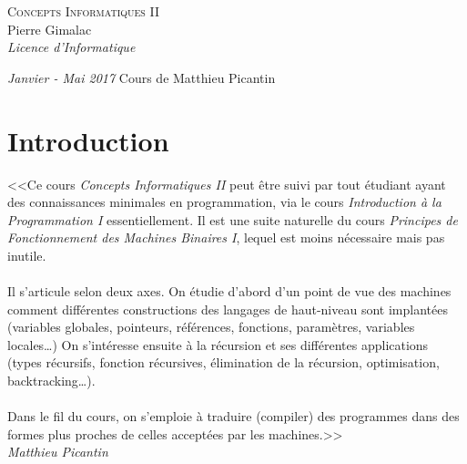 \documentclass[a4paper,10pt]{book} %
\begin{document}
\begin{titlepage}
\thispagestyle{empty}
\begin{center}
\vspace*{7cm}
\Huge \textsc{Concepts Informatiques II}\\
\vspace{1.5cm}
\Large Pierre Gimalac\\
\vspace{0.5cm}
\large \textit{Licence d'Informatique}
\vfill
\end{center}
\large \textit{Janvier - Mai 2017}
\hfill 
\large Cours de Matthieu Picantin
\restoregeometry
\end{titlepage}

\lstset{language=Java}

\renewcommand{\contentsname}{Sommaire}
\thispagestyle{empty}
\tableofcontents
\thispagestyle{empty}

\chapter*{Introduction}
<<Ce cours \textit{Concepts Informatiques II} peut être suivi par tout étudiant ayant des connaissances minimales en programmation, via le cours \textit{Introduction à la Programmation I} essentiellement. Il est une suite naturelle du cours \textit{Principes de Fonctionnement des Machines Binaires I}, lequel est moins nécessaire mais pas inutile.\\\\
Il s'articule selon deux axes. On étudie d’abord d’un point de vue des machines comment différentes constructions des langages de haut-niveau sont implantées (variables globales, pointeurs, références, fonctions, paramètres, variables locales…) On s’intéresse ensuite à la récursion et ses différentes applications (types récursifs, fonction récursives, élimination de la récursion, optimisation, backtracking…).\\\\
Dans le fil du cours, on s’emploie à traduire (compiler) des programmes dans des formes plus proches de celles acceptées par les machines.>>\\

\textit{Matthieu Picantin}


\end{document}
